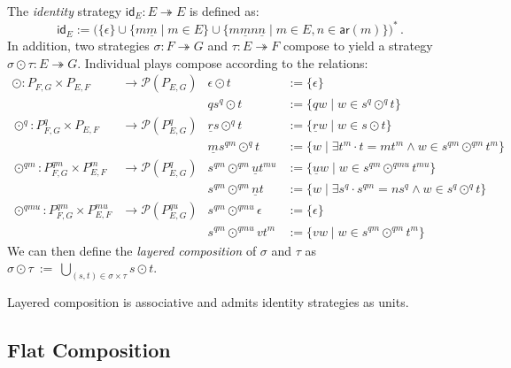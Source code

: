 \documentclass[acmsmall,screen,review,nonacm]{acmart}
\newcommand{\kw}[1]{\ensuremath{ \mathsf{#1} }}
\begin{document}
\begin{definition} \label{def:lcomp} %
The \emph{identity} strategy $\kw{id}_E : E \twoheadrightarrow E$
is defined as:
\[
  \kw{id}_E :=
    \bigl(
      \{\epsilon\} \cup 
      \{ m \underline{m} \mid m \in E \} \cup
      \{ m \underline{m} n \underline{n} \mid m \in E, n \in \kw{ar}(m) \}
    \bigr)^*
  \,.
\]
In addition, two strategies
$\sigma : F \twoheadrightarrow G$ and
$\tau : E \twoheadrightarrow F$
compose to yield a strategy
$\sigma \odot \tau : E \twoheadrightarrow G$.
Individual plays compose
according to the relations:
\begin{align*}
  {\odot} : P_{F,G} \times P_{E,F}
    &\rightarrow \mathcal{P}(P_{E,G}) &
  \epsilon \odot t &:= \{ \epsilon \} \\&&
  qs^q \odot t &:= \{ qw \mid w \in s^q \odot^q t \}
  \\
  {\odot}^q : P_{F,G}^q \times P_{E,F}
    &\rightarrow \mathcal{P}(P_{E,G}^q) &
  \underline{r} s \odot^q t &:=
    \{ \underline{r} w \mid w \in s \odot t \} \\&&
  \underline{m} s^{qm} \odot^q t &:=
    \{ w \mid \exists t^m \cdot t = mt^m \wedge w \in s^{qm} \odot^{qm} t^m \}
  \\
  {\odot}^{qm} : P_{F,G}^{qm} \times P_{E,F}^m
    &\rightarrow \mathcal{P}(P_{E,G}^q) &
  s^{qm} \odot^{qm} \underline{u} t^{mu} &:=
    \{ \underline{u} w \mid w \in s^{qm} \odot^{qmu} t^{mu} \} \\&&
  s^{qm} \odot^{qm} \underline{n} t &:=
    \{ w \mid \exists s^q \cdot s^{qm} = ns^q \wedge w \in s^q \odot^q t \}
  \\
  {\odot}^{qmu} : P_{F,G}^{qm} \times P_{E,F}^{mu}
    &\rightarrow \mathcal{P}(P_{E,G}^{qu}) &
  s^{qm} \odot^{qmu} \epsilon &:= \{ \epsilon \} \\&&
  s^{qm} \odot^{qmu} v t^m &:= \{ v w \mid w \in s^{qm} \odot^{qm} t^m \}
\end{align*}
We can then define the \emph{layered composition} of $\sigma$ and $\tau$ as
$
  \sigma \odot \tau \: := \:
    \bigcup_{(s,t) \in \sigma \times \tau}
      s \odot t
$.
\end{definition}

\begin{theorem}
Layered composition is associative
and admits identity strategies as units.
\end{theorem}


\subsection{Flat Composition} %
\end{document}
